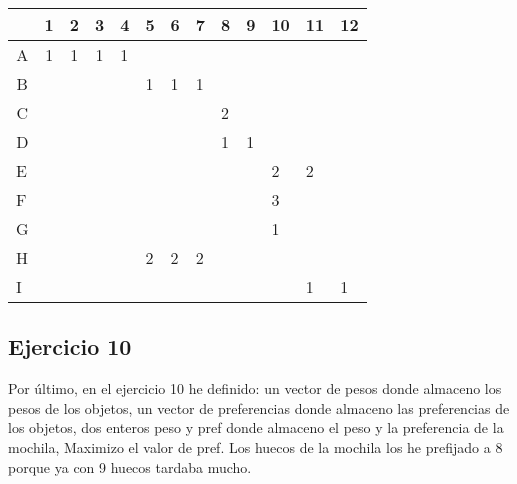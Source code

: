 \documentclass[a4paper,11pt]{article}
\begin{document}
\begin{table}[h]
\begin{tabular}{l|l|l|l|l|l|l|l|l|l|l|l|l|}
\cline{2-13}
\multicolumn{1}{c|}{}   & \multicolumn{1}{c|}{1} & \multicolumn{1}{c|}{2} & \multicolumn{1}{c|}{3} & 4 & 5 & 6 & 7 & 8 & 9 & 10 & 11 & 12 \\ \hline
\multicolumn{1}{|c|}{A} & \multicolumn{1}{c|}{1} & \multicolumn{1}{c|}{1} & \multicolumn{1}{c|}{1} & 1 &   &   &   &   &   &    &    &    \\ \hline
\multicolumn{1}{|c|}{B} & \multicolumn{1}{c|}{}  & \multicolumn{1}{c|}{}  & \multicolumn{1}{c|}{}  &   & 1 & 1 & 1 &   &   &    &    &    \\ \hline
\multicolumn{1}{|c|}{C} & \multicolumn{1}{c|}{}  & \multicolumn{1}{c|}{}  & \multicolumn{1}{c|}{}  &   &   &   &   & 2 &   &    &    &    \\ \hline
\multicolumn{1}{|c|}{D} &                        &                        & \multicolumn{1}{c|}{}  &   &   &   &   & 1 & 1 &    &    &    \\ \hline
\multicolumn{1}{|l|}{E} &                        &                        &                        &   &   &   &   &   &   & 2  & 2  &    \\ \hline
\multicolumn{1}{|l|}{F} &                        &                        &                        &   &   &   &   &   &   & 3  &    &    \\ \hline
\multicolumn{1}{|l|}{G} &                        &                        &                        &   &   &   &   &   &   & 1  &    &    \\ \hline
\multicolumn{1}{|l|}{H} &                        &                        &                        &   & 2 & 2 & 2 &   &   &    &    &    \\ \hline
\multicolumn{1}{|l|}{I} &                        &                        &                        &   &   &   &   &   &   &    & 1  & 1  \\ \hline
\end{tabular}
\end{table}

\subsection{Ejercicio 10}
Por último, en el ejercicio 10 he definido: un vector de pesos donde almaceno los pesos de los objetos, un vector de preferencias donde almaceno las preferencias de los objetos, dos enteros peso y pref donde almaceno el peso y la preferencia de la mochila, Maximizo el valor de pref. Los huecos de la mochila los he prefijado a 8 porque ya con 9 huecos tardaba mucho.
\end{document}
